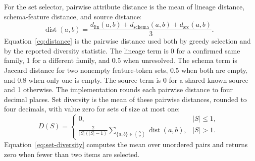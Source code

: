 \documentclass[conference]{IEEEtran}
\begin{document}
For the set selector, pairwise attribute distance is the mean of lineage distance, schema-feature distance, and source distance:
\begin{equation}
\operatorname{dist}(a,b)=
\frac{d_{\mathrm{lin}}(a,b)+d_{\mathrm{schema}}(a,b)+d_{\mathrm{src}}(a,b)}{3}.
\label{eq:distance}
\end{equation}
Equation~\ref{eq:distance} is the pairwise distance used both by greedy selection and by the reported diversity statistic.
The lineage term is 0 for a confirmed same family, 1 for a different family, and 0.5 when unresolved. The schema term is Jaccard distance for two nonempty feature-token sets, 0.5 when both are empty, and 0.8 when only one is empty. The source term is 0 for a shared known source and 1 otherwise. The implementation rounds each pairwise distance to four decimal places. Set diversity is the mean of these pairwise distances, rounded to four decimals, with value zero for sets of size at most one:
\begin{equation}
D(S)=
\begin{cases}
0, & |S|\leq 1,\\[2pt]
\displaystyle\frac{2}{|S|(|S|-1)}
\sum_{\{a,b\}\in\binom{S}{2}}\operatorname{dist}(a,b), & |S|>1.
\end{cases}
\label{eq:set-diversity}
\end{equation}
Equation~\ref{eq:set-diversity} computes the mean over unordered pairs and returns zero when fewer than two items are selected.
\end{document}
